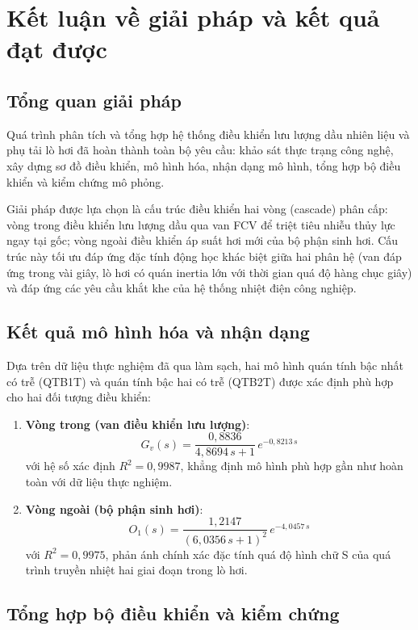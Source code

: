 \documentclass[../main.tex]{subfiles}
\begin{document}
\section{Kết luận về giải pháp và kết quả đạt được}

\subsection{Tổng quan giải pháp}

Quá trình phân tích và tổng hợp hệ thống điều khiển lưu lượng dầu nhiên liệu và phụ tải lò hơi đã hoàn thành toàn bộ yêu cầu: khảo sát thực trạng công nghệ, xây dựng sơ đồ điều khiển, mô hình hóa, nhận dạng mô hình, tổng hợp bộ điều khiển và kiểm chứng mô phỏng.

Giải pháp được lựa chọn là cấu trúc điều khiển hai vòng (cascade) phân cấp: vòng trong điều khiển lưu lượng dầu qua van FCV để triệt tiêu nhiễu thủy lực ngay tại gốc; vòng ngoài điều khiển áp suất hơi mới của bộ phận sinh hơi. Cấu trúc này tối ưu đáp ứng đặc tính động học khác biệt giữa hai phân hệ (van đáp ứng trong vài giây, lò hơi có quán inertia lớn với thời gian quá độ hàng chục giây) và đáp ứng các yêu cầu khắt khe của hệ thống nhiệt điện công nghiệp.

\subsection{Kết quả mô hình hóa và nhận dạng}

Dựa trên dữ liệu thực nghiệm đã qua làm sạch, hai mô hình quán tính bậc nhất có trễ (QTB1T) và quán tính bậc hai có trễ (QTB2T) được xác định phù hợp cho hai đối tượng điều khiển:

\begin{enumerate}
    \item \textbf{Vòng trong (van điều khiển lưu lượng)}:
    \[
        G_v(s) = \frac{0{,}8836}{4{,}8694\,s + 1}\,e^{-0{,}8213\,s}
    \]
    với hệ số xác định $R^2 = 0{,}9987$, khẳng định mô hình phù hợp gần như hoàn toàn với dữ liệu thực nghiệm.

    \item \textbf{Vòng ngoài (bộ phận sinh hơi)}:
    \[
        O_1(s) = \frac{1{,}2147}{(6{,}0356\,s + 1)^2}\,e^{-4{,}0457\,s}
    \]
    với $R^2 = 0{,}9975$, phản ánh chính xác đặc tính quá độ hình chữ S của quá trình truyền nhiệt hai giai đoạn trong lò hơi.
\end{enumerate}

\subsection{Tổng hợp bộ điều khiển và kiểm chứng}
\end{document}
